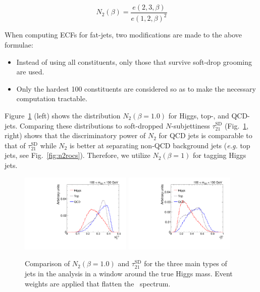\begin{equation}
  N_2(\beta) = \frac{e(2,3,\beta)}{e(1,2,\beta)^2}
\end{equation}

When computing ECFs for fat-jets, two modifications are made to the above formulae:
\begin{itemize}
  \item Instead of using all constituents, only those that survive soft-drop grooming are used.
  \item Only the hardest 100 constituents are considered so as to make
  the necessary computation tractable.
\end{itemize}


Figure~\ref{fig:n2tau21} (left) shows the distribution
$N_2(\beta=1.0)$ for Higgs, top-, and QCD-jets. Comparing these
distributions to soft-dropped $N$-subjettiness $\tau_{21}^{\text{SD}}$
(Fig.~\ref{fig:n2tau21}, right) shows that the discriminatory power of
$N_2$ for QCD jets is comparable to that of $\tau_{21}^{\text{SD}}$ while $N_2$ is better at separating non-QCD background
jets ({\it e.g.} top jets, see Fig.~\ref{fig:n2rocs}). Therefore, we
utilize $N_2(\beta=1)$ for tagging Higgs jets.
 

\begin{figure}
  \centering
  \includegraphics[width=0.475\textwidth]{figures/higgstagging/n2ddt/ddt_N2_10_ns.pdf}
  \includegraphics[width=0.475\textwidth]{figures/higgstagging/n2ddt/ddt_tau21SD_ns.pdf}
  \caption{Comparison of $N_2(\beta=1.0)$ and $\tau_{21}^\text{SD}$ for the three main types of jets in the analysis in a window around the true Higgs mass. Event weights are applied that flatten the \pt~spectrum.}
  \label{fig:n2tau21}
\end{figure}


